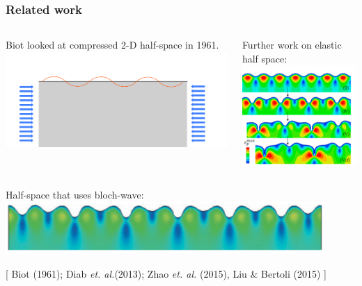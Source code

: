 \documentclass{beamer}
\begin{document}
\begin{frame}
	\frametitle {\large Related work}

	\begin{columns}
	 	\begin{center}	Biot looked at compressed 2-D half-space in 1961.
		\includegraphics[scale=0.25]{myFigures/halfSpace}
	\end{center}
	\begin{center}
Further work on elastic half space:
	\includegraphics[scale=0.35]{myFigures/wrinklingPicture}
	\end{center}
	\end{columns}
	
	\vspace{0.1 in}
	\begin{center}
	Half-space that uses bloch-wave:
	\includegraphics[scale=0.7]{myFigures/bertoli}
	\end{center}
		
	\scriptsize[\color{orange} Biot (1961); Diab \textit{et. al.}(2013); Zhao \textit{et. al.} (2015), Liu \& Bertoli (2015) \color{black}]
\end{frame}
\end{document}
